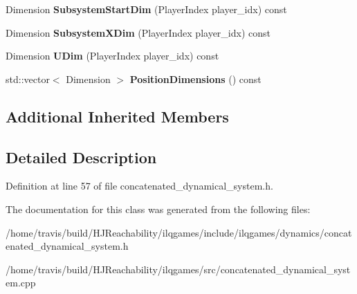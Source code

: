 \begin{DoxyCompactItemize}
\item 
Dimension {\bfseries Subsystem\+Start\+Dim} (Player\+Index player\+\_\+idx) const \hypertarget{classilqgames_1_1_concatenated_dynamical_system_a14a0206022b433d335fb70fcf9e5ac85}{}\label{classilqgames_1_1_concatenated_dynamical_system_a14a0206022b433d335fb70fcf9e5ac85}

\item 
Dimension {\bfseries Subsystem\+X\+Dim} (Player\+Index player\+\_\+idx) const \hypertarget{classilqgames_1_1_concatenated_dynamical_system_a8a41a816bf3320cd6d78548beac02d80}{}\label{classilqgames_1_1_concatenated_dynamical_system_a8a41a816bf3320cd6d78548beac02d80}

\item 
Dimension {\bfseries U\+Dim} (Player\+Index player\+\_\+idx) const \hypertarget{classilqgames_1_1_concatenated_dynamical_system_a99e27c1644875b924741e037bcb54460}{}\label{classilqgames_1_1_concatenated_dynamical_system_a99e27c1644875b924741e037bcb54460}

\item 
std\+::vector$<$ Dimension $>$ {\bfseries Position\+Dimensions} () const \hypertarget{classilqgames_1_1_concatenated_dynamical_system_af87c59c62ce8e7a8d57f9a394f7ca4e0}{}\label{classilqgames_1_1_concatenated_dynamical_system_af87c59c62ce8e7a8d57f9a394f7ca4e0}

\end{DoxyCompactItemize}
\subsection*{Additional Inherited Members}


\subsection{Detailed Description}


Definition at line 57 of file concatenated\+\_\+dynamical\+\_\+system.\+h.



The documentation for this class was generated from the following files\+:\begin{DoxyCompactItemize}
\item 
/home/travis/build/\+H\+J\+Reachability/ilqgames/include/ilqgames/dynamics/concatenated\+\_\+dynamical\+\_\+system.\+h\item 
/home/travis/build/\+H\+J\+Reachability/ilqgames/src/concatenated\+\_\+dynamical\+\_\+system.\+cpp\end{DoxyCompactItemize}
